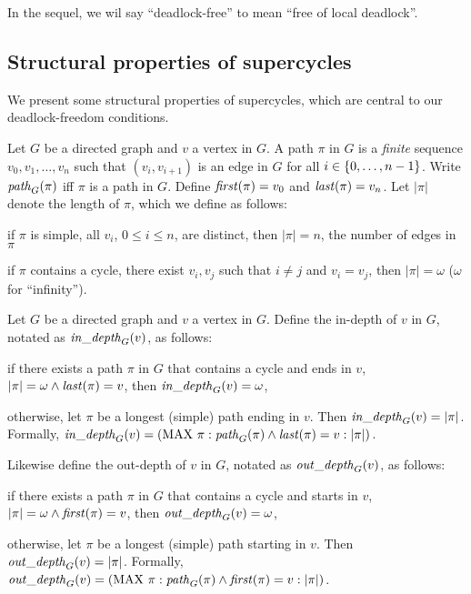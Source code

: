 In the sequel, we wil say ``deadlock-free'' to mean ``free of local deadlock''.



\subsection{Structural properties of supercycles}

We present some structural properties of supercycles, which
are central to our deadlock-freedom conditions.


 \label{def:path}
Let $G$ be a directed graph and $v$ a vertex in $G$. A path $\pi$ in $G$ is a \emph{finite} sequence
$v_0, v_1, \ldots,v_n$ such that $(v_i, v_{i+1})$ is an edge in $G$ for all $i \in \{ 0,\ldots,n-1 \}$.
Write $\mathit{path}_{G}(\pi)$ iff $\pi$ is a path in $G$.
Define $\mathit{first}(\pi) = v_0$ and $\mathit{last}(\pi) = v_n$. 
%
Let $|\pi|$ denote the length of $\pi$, which we define as follows:
\be
\item if $\pi$ is simple, \ie all $v_i$, $0 \le i \le n$, are distinct, then $|\pi| = n$, \ie the
number of edges in $\pi$
\item if $\pi$ contains a cycle, \ie there exist $v_i, v_j$ such that $i \ne j$ and $v_i = v_j$, then
$|\pi| = \omega$ ($\omega$ for ``infinity'').
\ee

\ed

 \label{def:depth} 
Let $G$ be a directed graph and $v$ a vertex in $G$. Define the in-depth of $v$ in $G$, notated as
$\mathit{in\_depth}_{G}({v})$, as follows:
\be
\item if there exists a path $\pi$ in $G$ that contains a cycle and ends in $v$, \ie $|\pi| = \omega
  \land \mathit{last}(\pi) = v$, then $\mathit{in\_depth}_{G}({v}) = \omega$,

\item otherwise, let $\pi$ be a longest (simple) path ending in $v$. Then $\mathit{in\_depth}_{G}({v}) = |\pi|$.
\ee
Formally, $\mathit{in\_depth}_{G}({v}) = (\mathrm{MAX}\ \pi : \mathit{path}_{G}(\pi) \land \mathit{last}(\pi) = v : |\pi|)$.

Likewise define the out-depth of $v$ in $G$, notated as
$\mathit{out\_depth}_{G}({v})$, as follows:
\be
\item if there exists a path $\pi$ in $G$ that contains a cycle and starts in $v$, \ie $|\pi| = \omega
  \land \mathit{first}(\pi) = v$, then $\mathit{out\_depth}_{G}({v}) = \omega$,

\item otherwise, let $\pi$ be a longest (simple) path starting in $v$. Then $\mathit{out\_depth}_{G}({v}) = |\pi|$.
\ee
Formally, $\mathit{out\_depth}_{G}({v}) = (\mathrm{MAX}\ \pi : \mathit{path}_{G}(\pi) \land \mathit{first}(\pi) = v : |\pi|)$.
\ed

